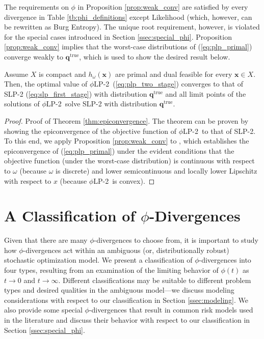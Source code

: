 \documentclass[opre,nonblindrev]{informs3} %
\newcommand{\x}{\mathbf{x}}
\newcommand{\q}{\mathbf{q}}
\newcommand{\qtrue}{\q^{\text{true}}}
\newcommand{\plp}{$\phi$LP-2}
\begin{document}
The requirements on $\phi$ in Proposition \ref{prop:weak_conv} are satisfied by every divergence in Table \ref{tb:phi_definitions} except Likelihood (which, however, can be rewritten as Burg Entropy).
The unique root requirement, however, is violated for the special cases introduced in Section \ref{ssec:special_phi}.
Proposition \ref{prop:weak_conv} implies that the worst-case distributions of (\ref{eq:plp_primal}) converge weakly to $\qtrue$, which is used to show the desired result below. 
\begin{theorem}
	\label{thm:epiconvergence}
	Assume $X$ is compact and $h_\omega(\x)$ are primal and dual feasible for every $\x \in X$.
	Then, the optimal value of \plp\ (\ref{eq:plp_two_stage}) converges to that of SLP-2 (\ref{eq:slp_first_stage}) with distribution $\qtrue$ and all limit points of the solutions of \plp\ solve SLP-2 with distribution $\qtrue$.
\end{theorem}

\begin{proof}{\sc Proof of Theorem \ref{thm:epiconvergence}.}
	The theorem can be proven by showing the epiconvergence of the objective function of \plp\ to that of SLP-2.
    To this end, we apply Proposition \ref{prop:weak_conv} to \citep[Theorem 3.7]{dupacova1988asymptotic}, which establishes the epiconvergence of (\ref{eq:plp_primal}) under the evident conditions that the objective function (under the worst-case distribution) is continuous with respect to $\omega$ (because $\omega$ is discrete) and lower semicontinuous and locally lower Lipschitz with respect to $x$ (because \plp\ is convex).
    \Halmos
\end{proof}




\section{A Classification of $\phi$-Divergences}
\label{sec:classification}

Given that there are many $\phi$-divergences to choose from, it is important to study how $\phi$-divergences act within an ambiguous (or, distributionally robust) stochastic optimization model. 
We present a classification of $\phi$-divergences into four types, resulting from an examination of the limiting behavior of $\phi(t)$ as $t \rightarrow 0$ and $t \rightarrow \infty$.
Different classifications may be suitable to different problem types and desired qualities in the ambiguous model---we discuss modeling considerations with respect to our classification in Section \ref{ssec:modeling}.
We also provide some special $\phi$-divergences that result in common risk models used in the literature and discuss their behavior with respect to our classification in Section \ref{ssec:special_phi}.
\end{document}
